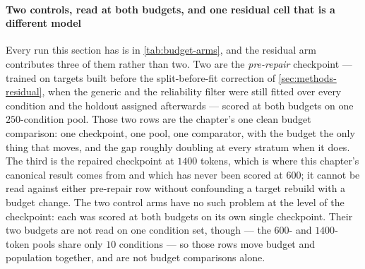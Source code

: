 
\paragraph{Two controls, read at both budgets, and one residual cell that is a
different model}
 Every run this section has is in \cref{tab:budget-arms}, and the residual arm
contributes three of them rather than two. Two are the \emph{pre-repair}
checkpoint --- trained on targets built before the split-before-fit correction of
\cref{sec:methods-residual}, when the generic and the reliability filter were
still fitted over every condition and the holdout assigned afterwards --- scored
at both budgets on one $\num{250}$-condition pool. Those two rows are the
chapter's one clean budget comparison: one checkpoint, one pool, one comparator,
with the budget the only thing that moves, and the gap roughly doubling at every
stratum when it does. The third is the repaired checkpoint at $1400$ tokens, which
is where this chapter's canonical result comes from and which has never been
scored at $600$; it cannot be read against either pre-repair row without
confounding a target rebuild with a budget change. The two
control arms have no such problem at the level of the checkpoint: each was scored
at both budgets on its own single checkpoint. Their two budgets are not read on
one condition set, though --- the $600$- and $1400$-token pools share only
$\num{10}$ conditions --- so those rows move budget and population together, and
are not budget comparisons alone.

